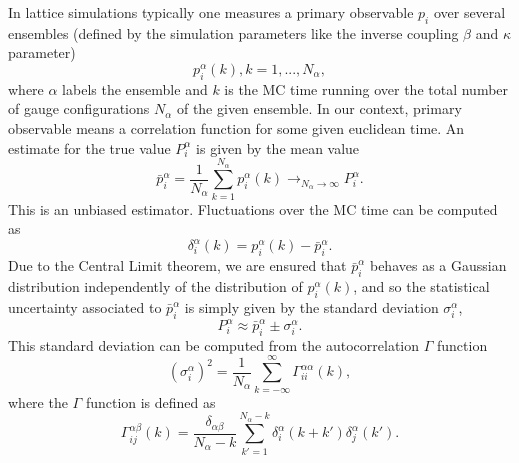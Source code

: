 In lattice simulations typically one measures a primary observable $p_i$ over several ensembles (defined by the simulation parameters like the inverse coupling $\beta$ and $\kappa$ parameter) 
\begin{equation}
p_i^{\alpha}(k), k=1,...,N_{\alpha},
\end{equation}
where $\alpha$ labels the ensemble and $k$ is the MC time running over the total number of gauge configurations $N_{\alpha}$ of the given ensemble. In our context, primary observable means a correlation function for some given euclidean time. An estimate for the true value $P_i^{\alpha}$ is given by the mean value
\begin{equation}
\bar{p}_i^{\alpha}=\frac{1}{N_{\alpha}}\sum_{k=1}^{N_{\alpha}}p_i^{\alpha}(k)\rightarrow_{N_{\alpha}\rightarrow\infty}P_i^{\alpha}.
\end{equation}
This is an unbiased estimator. Fluctuations over the MC time can be computed as
\begin{equation}
\delta_i^{\alpha}(k)=p_i^{\alpha}(k)-\bar{p}_i^{\alpha}.
\end{equation}
Due to the Central Limit theorem, we are ensured that $\bar{p}_i^{\alpha}$ behaves as a Gaussian distribution independently of the distribution of $p_i^{\alpha}(k)$, and so the statistical uncertainty associated to $\bar{p}_i^{\alpha}$ is simply given by the standard deviation $\sigma_i^{\alpha}$,
\begin{equation}
P_i^{\alpha}\approx\bar{p}_i^{\alpha}\pm\sigma_i^{\alpha}.
\end{equation}
This standard deviation can be computed from the autocorrelation $\Gamma$ function
\begin{equation}
(\sigma_i^{\alpha})^2=\frac{1}{N_{\alpha}}\sum_{k=-\infty}^{\infty}\Gamma_{ii}^{\alpha\alpha}(k),
\end{equation}
where the $\Gamma$ function is defined as
\begin{equation}
\Gamma_{ij}^{\alpha\beta}(k)=\frac{\delta_{\alpha\beta}}{N_{\alpha}-k}\sum_{k'=1}^{N_{\alpha}-k}\delta_i^{\alpha}(k+k')\delta_j^{\alpha}(k').
\end{equation}

